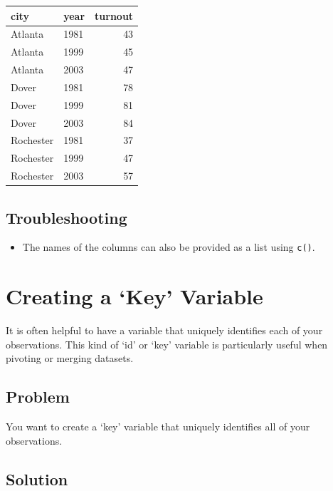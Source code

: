 \documentclass[
]{book}
\providecommand{\tightlist}{%
  \setlength{\itemsep}{0pt}\setlength{\parskip}{0pt}}
\begin{document}
\begin{tabular}{l|l|r}
\hline
city & year & turnout\\
\hline
Atlanta & 1981 & 43\\
\hline
Atlanta & 1999 & 45\\
\hline
Atlanta & 2003 & 47\\
\hline
Dover & 1981 & 78\\
\hline
Dover & 1999 & 81\\
\hline
Dover & 2003 & 84\\
\hline
Rochester & 1981 & 37\\
\hline
Rochester & 1999 & 47\\
\hline
Rochester & 2003 & 57\\
\hline
\end{tabular}

\hypertarget{troubleshooting-23}{%
\subsection{Troubleshooting}\label{troubleshooting-23}}

\begin{itemize}
\tightlist
\item
  The names of the columns can also be provided as a list using \texttt{c()}.
\end{itemize}

\hypertarget{key}{%
\section{Creating a `Key' Variable}\label{key}}

It is often helpful to have a variable that uniquely identifies each of your observations. This kind of `id' or `key' variable is particularly useful when pivoting or merging datasets.

\hypertarget{problem-27}{%
\subsection{Problem}\label{problem-27}}

You want to create a `key' variable that uniquely identifies all of your observations.

\hypertarget{solution-26}{%
\subsection{Solution}\label{solution-26}}
\end{document}
